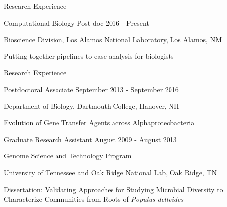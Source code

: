 \documentclass{resume} %
\begin{document}
\begin{rSection}{Research Experience}
\begin{rSubsection}{Computational Biology Post doc} {2016 - Present}{}{}
\item Bioscience Division, Los Alamos National Laboratory, Los Alamos, NM
\item Putting together pipelines to ease analysis for biologists
\end{rSubsection}

\begin{rSection}{Research Experience}
\begin{rSubsection}{Postdoctoral Associate} {September 2013 - September 2016}{}{}
\item Department of Biology, Dartmouth College, Hanover, NH
\item Evolution of Gene Transfer Agents across Alphaproteobacteria
\end{rSubsection}

\begin{rSubsection}{Graduate Research Assistant} {August 2009 - August 2013}{}{}
\item Genome Science and Technology Program
\item University of Tennessee and Oak Ridge National Lab, Oak Ridge, TN 
\item Dissertation: Validating Approaches for Studying Microbial Diversity to Characterize Communities from Roots of \textit{Populus deltoides}
\end{rSubsection}
\end{rSection}



\end{rSection}
\end{document}
